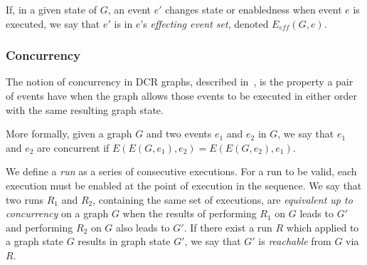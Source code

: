 \documentclass{article}
\begin{document}
			If, in a given state of $G$, an event $e'$ changes state or enabledness when event $e$ is executed, we say that $e'$ is in $e$'s \textit{effecting event set}, denoted $E_{eff}(G,e)$.

			\subsubsection{Concurrency}
			\label{subsubsec:concurrency}

			The notion of concurrency in DCR graphs, described in~\cite{debois_concurrency_2015}, is the property a pair of events have when the graph allows those events to be executed in either order with the same resulting graph state.

			More formally, given a graph $G$ and two events $e_1$ and $e_2$ in $G$, we say that $e_1$ and $e_2$ are concurrent if $E(E(G, e_1),e_2)=E(E(G, e_2),e_1)$.

			We define a \textit{run} as a series of consecutive executions.
			For a run to be valid, each execution must be enabled at the point of execution in the sequence.
			We say that two runs $R_1$ and $R_2$, containing the same set of executions, are \textit{equivalent up to concurrency} on a graph $G$ when the results of performing $R_1$ on $G$ leads to $G'$ and performing $R_2$ on $G$ also leads to $G'$.
			If there exist a run $R$ which applied to a graph state $G$ results in graph state $G'$, we say that $G'$ is \textit{reachable} from $G$ via $R$.
\end{document}
